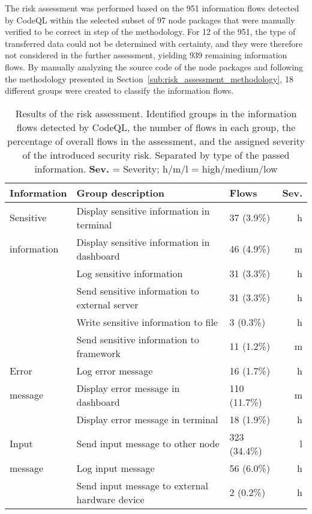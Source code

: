 The risk assessment was performed based on the 951 information flows detected by CodeQL within the selected subset of 97 node packages that were manually verified to be correct in step {\small{}} of the methodology.
For 12 of the 951, the type of transferred data could not be determined with certainty, and they were therefore not considered in the further assessment, yielding 939 remaining information flows.
By manually analyzing the source code of the node packages and following the methodology presented in Section~\ref{sub:risk_assessment_methodology}, 18 different groups were created to classify the information flows.
%
\begin{table}
    \small
    \centering
	\caption{Results of the risk assessment. Identified groups in the information flows detected by CodeQL, the number of flows in each group, the percentage of overall flows in the assessment, and the assigned severity of the introduced security risk. Separated by type of the passed information. \textbf{Sev.} = Severity; h/m/l = high/medium/low}
	\label{tbl:risk_assessment_results}
    \begin{tabular}{p{2.1cm}p{7.1cm}p{1.8cm}r}
        \toprule
        \textbf{Information} & \textbf{Group description} & \textbf{Flows} & \textbf{Sev.} \\
        \midrule
        Sensitive  & Display sensitive information in terminal & 37 (3.9\%) & h \\
        information & Display sensitive information in dashboard & 46 (4.9\%) & m \\
         & Log sensitive information & 31 (3.3\%) & h \\
         & Send sensitive information to external server & 31 (3.3\%) & h \\
         & Write sensitive information to file & 3 (0.3\%) & h \\
         & Send sensitive information to framework & 11 (1.2\%) & m \\
        \midrule
        Error  & Log error message & 16 (1.7\%) & h \\
        message & Display error message in dashboard & 110 (11.7\%) & m \\
         & Display error message in terminal & 18 (1.9\%) & h \\
        \midrule
        Input  & Send input message to other node & 323 (34.4\%) & l \\
        message & Log input message & 56 (6.0\%) & h \\
         & Send input message to external hardware device & 2 (0.2\%) & h \\

\end{tabular}
\end{table}
